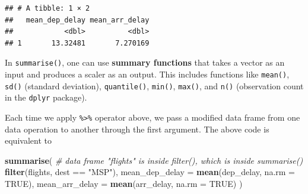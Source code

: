\documentclass[]{book}
\newenvironment{Shaded}{\begin{snugshade}}{\end{snugshade}}
\newcommand{\KeywordTok}[1]{\textcolor[rgb]{0.13,0.29,0.53}{\textbf{{#1}}}}
\newcommand{\DataTypeTok}[1]{\textcolor[rgb]{0.13,0.29,0.53}{{#1}}}
\newcommand{\StringTok}[1]{\textcolor[rgb]{0.31,0.60,0.02}{{#1}}}
\newcommand{\CommentTok}[1]{\textcolor[rgb]{0.56,0.35,0.01}{\textit{{#1}}}}
\newcommand{\OtherTok}[1]{\textcolor[rgb]{0.56,0.35,0.01}{{#1}}}
\newcommand{\NormalTok}[1]{{#1}}
\theoremstyle{definition}
\theoremstyle{definition}
\theoremstyle{remark}
\begin{document}
\begin{Shaded}
\end{Shaded}

\begin{verbatim}
## # A tibble: 1 × 2
##   mean_dep_delay mean_arr_delay
##            <dbl>          <dbl>
## 1       13.32481       7.270169
\end{verbatim}

In \texttt{summarise()}, one can use \textbf{summary functions} that
takes a vector as an input and produces a scaler as an output. This
includes functions like \texttt{mean()}, \texttt{sd()} (standard
deviation), \texttt{quantile()}, \texttt{min()}, \texttt{max()}, and
\texttt{n()} (observation count in the \texttt{dplyr} package).

Each time we apply \texttt{\%\textgreater{}\%} operator above, we pass a
modified data frame from one data operation to another through the first
argument. The above code is equivalent to

\begin{Shaded}
\begin{Highlighting}[]
\KeywordTok{summarise}\NormalTok{(   }\CommentTok{# data frame "flights" is inside filter(), which is inside summarise() }
    \KeywordTok{filter}\NormalTok{(flights, dest ==}\StringTok{ "MSP"}\NormalTok{), }
    \DataTypeTok{mean_dep_delay =} \KeywordTok{mean}\NormalTok{(dep_delay, }\DataTypeTok{na.rm =} \OtherTok{TRUE}\NormalTok{),}
    \DataTypeTok{mean_arr_delay =} \KeywordTok{mean}\NormalTok{(arr_delay, }\DataTypeTok{na.rm =} \OtherTok{TRUE}\NormalTok{)}
    \NormalTok{)}
\end{Highlighting}
\end{Shaded}
\end{document}
